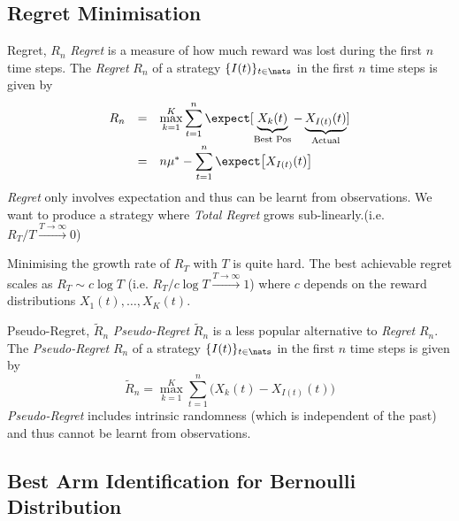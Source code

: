 \documentclass[11pt,a4paper]{article}
\begin{document}
\subsection{Regret Minimisation}

\begin{definition}{Regret, $R_n$}
  \textit{Regret} is a measure of how much reward was lost during the first $n$ time steps. The \textit{Regret} $R_n$ of a strategy $\{I(t)\}_{t\in\nats}$ in the first $n$ time steps is given by
  \[\begin{array}{rcl}
    R_n&=&{\displaystyle \max\limits_{k=1}^K\sum_{t=1}^n \expect[\underbrace{X_k(t)}_\text{Best Pos}-\underbrace{X_{I(t)}(t)}_\text{Actual}]}\\
    &=&n\mu^*-{\displaystyle\sum_{t=1}^n\expect\big[X_{I(t)}(t)\big]}
  \end{array}\]
  \textit{Regret} only involves expectation and thus can be learnt from observations. We want to produce a strategy where \textit{Total Regret} grows sub-linearly.(i.e. $R_T/T\overset{T\to\infty}\longrightarrow0$)
\end{definition}

\begin{remark}{Minimising the growth rate of $R_T$ with $T$ is quite hard.}
  The best achievable regret scales as $R_T\sim c\log T$ (i.e. $R_T/c\log T\overset{T\to\infty}\longrightarrow1$) where $c$ depends on the reward distributions $X_1(t),\dots,X_K(t)$.
\end{remark}

\begin{definition}{Pseudo-Regret, $\tilde{R}_n$}
  \textit{Pseudo-Regret} $\tilde{R}_n$ is a less popular alternative to \textit{Regret} $R_n$.
  The \textit{Pseudo-Regret} $R_n$ of a strategy $\{I(t)\}_{t\in\nats}$ in the first $n$ time steps is given by
  \[ \tilde{R}_n=\max\limits_{k=1}^K\sum_{t=1}^n\big(X_k(t)-X_{I(t)}(t)\big) \]
  \textit{Pseudo-Regret} includes intrinsic randomness (which is independent of the past) and thus cannot be learnt from observations.
\end{definition}

\subsection{Best Arm Identification for Bernoulli Distribution}
\end{document}
